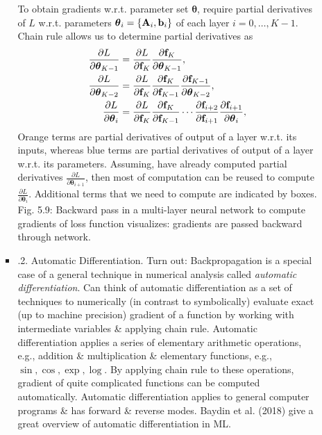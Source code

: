 \documentclass{article}
\begin{document}
\begin{itemize}
\begin{itemize}
\begin{itemize}
			To obtain gradients w.r.t. parameter set $\boldsymbol{\theta}$, require partial derivatives of $L$ w.r.t. parameters $\boldsymbol{\theta}_i = \{{\bf A}_i,{\bf b}_i\}$ of each layer $i = 0,\ldots,K - 1$. Chain rule allows us to determine partial derivatives as
			\begin{align}
				\frac{\partial L}{\partial\boldsymbol{\theta}_{K-1}} &= \frac{\partial L}{\partial{\bf f}_K}\frac{\partial{\bf f}_K}{\partial\boldsymbol{\theta}_{K-1}},\\
				\frac{\partial L}{\partial\boldsymbol{\theta}_{K-2}} &= \frac{\partial L}{\partial{\bf f}_K}\frac{\partial{\bf f}_K}{\partial{\bf f}_{K-1}}\frac{\partial{\bf f}_{K-1}}{\partial\boldsymbol{\theta}_{K-2}},\\
				\frac{\partial L}{\partial\boldsymbol{\theta}_i} &= \frac{\partial L}{\partial{\bf f}_K}\frac{\partial{\bf f}_K}{\partial{\bf f}_{K-1}}\cdots\frac{\partial{\bf f}_{i+2}}{\partial{\bf f}_{i+1}}\frac{\partial{\bf f}_{i+1}}{\partial\boldsymbol{\theta}_i},\\
			\end{align}
			Orange terms are partial derivatives of output of a layer w.r.t. its inputs, whereas blue terms are partial derivatives of output of a layer w.r.t. its parameters. Assuming, have already computed partial derivatives $\frac{\partial L}{\partial\boldsymbol{\theta}_{i+1}}$, then most of computation can be reused to compute $\frac{\partial L}{\partial\boldsymbol{\theta}_i}$. Additional terms that we need to compute are indicated by boxes. {\sf Fig. 5.9: Backward pass in a multi-layer neural network to compute gradients of loss function} visualizes: gradients are passed backward through network.
			\item {.2. Automatic Differentiation.} Turn out: Backpropagation is a special case of a general technique in numerical analysis called {\it automatic differentiation}. Can think of automatic differentiation as a set of techniques to numerically (in contrast to symbolically) evaluate exact (up to machine precision) gradient of a function by working with intermediate variables \& applying chain rule. Automatic differentiation applies a series of elementary arithmetic operations, e.g., addition \& multiplication \& elementary functions, e.g., $\sin,\cos,\exp,\log$. By applying chain rule to these operations, gradient of quite complicated functions can be computed automatically. Automatic differentiation applies to general computer programs \& has forward \& reverse modes. Baydin et al. (2018) give a great overview of automatic differentiation in ML.
			

\end{itemize}
\end{itemize}
\end{itemize}
\end{document}
